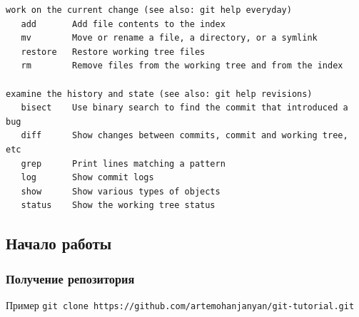 \documentclass[pdf,russian,aspectratio=169]{beamer}
\begin{document}
\begin{frame}[fragile]
\begin{Verbatim}[fontsize=\relsize{-3}]
work on the current change (see also: git help everyday)
   add       Add file contents to the index
   mv        Move or rename a file, a directory, or a symlink
   restore   Restore working tree files
   rm        Remove files from the working tree and from the index

examine the history and state (see also: git help revisions)
   bisect    Use binary search to find the commit that introduced a bug
   diff      Show changes between commits, commit and working tree, etc
   grep      Print lines matching a pattern
   log       Show commit logs
   show      Show various types of objects
   status    Show the working tree status
    \end{Verbatim}
\end{frame}

\subsection{Начало работы}


\begin{frame}
    \frametitle{Получение репозитория}
    \begin{exampleblock}{Пример}
        \texttt{git clone https://github.com/artemohanjanyan/git-tutorial.git}
    \end{exampleblock}
\end{frame}
\end{document}
